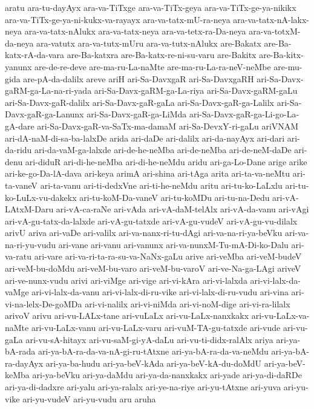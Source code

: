 {aratu
ara-tu-dayAyx
ara-va-TiTxge
ara-va-TiTx-geya
ara-va-TiTx-ge-ya-nikikx
ara-va-TiTx-ge-ya-ni-kukx-va-rayayx
ara-va-tatx-mU-ra-neya
ara-va-tatx-nA-lakx-neya
ara-va-tatx-nAlukx
ara-va-tatx-neya
ara-va-tetx-ra-Da-neya
ara-va-totxM-da-neya
ara-vatutx
ara-va-tutx-mUru
ara-va-tutx-nAlukx
are-Bakatx
are-Ba-katx-rA-da-vara
are-Ba-katxra
are-Ba-katx-re-ni-su-varu
are-Bakitx
are-Ba-kitx-yanunx
are-de-re-deve
are-ma-ru-La-naMte
are-ma-ru-La-ra-neV-neMbe
are-mu-gida
are-pA-da-dalilx
areve
ariH
ari-Sa-DavxgaR
ari-Sa-DavxgaRH
ari-Sa-Davx-gaRM-ga-La-na-ri-yada
ari-Sa-Davx-gaRM-ga-La-riya
ari-Sa-Davx-gaRM-gaLu
ari-Sa-Davx-gaR-dalilx
ari-Sa-Davx-gaR-gaLa
ari-Sa-Davx-gaR-ga-Lalilx
ari-Sa-Davx-gaR-ga-Lanunx
ari-Sa-Davx-gaR-ga-LiMda
ari-Sa-Davx-gaR-ga-Li-go-La-gA-dare
ari-Sa-Davx-gaR-va-SaTx-ma-damaM
ari-Sa-DevxY-ri-gaLu
ariVNAM
ari-dA-naM-di-sa-ba-lalxDe
arida
ari-daDe
ari-dalilx
ari-da-nayAyx
ari-dari
ari-da-ridu
ari-da-vaM-ga-lalxde
ari-de-he-neMba
ari-de-neMba
ari-de-neM-daDe
ari-denu
ari-diduR
ari-di-he-neMba
ari-di-he-neMdu
aridu
ari-ga-Lo-Dane
arige
arike
ari-ke-go-Da-lA-dava
ari-keya
arimA
ari-shina
ari-tAga
arita
ari-ta-va-neMtu
ari-ta-vaneV
ari-ta-vanu
ari-ti-dedxVne
ari-ti-he-neMdu
aritu
ari-tu-ko-LaLxlu
ari-tu-ko-LuLx-vu-dakekx
ari-tu-koM-Da-vaneV
ari-tu-koMDu
ari-tu-na-Dedu
ari-vA-LAtxM-Daru
ari-vA-ca-raNe
ari-vAda
ari-vA-daM-telAlx
ari-vA-da-vanu
ari-vAgi
ari-vA-gu-tatx-da-lalxde
ari-vA-gu-tatxde
ari-vA-gu-vudeV
ari-vA-gu-vu-dilalx
arivU
ariva
ari-vaDe
ari-valilx
ari-va-nanx-ri-tu-dAgi
ari-va-na-ri-ya-beVku
ari-va-na-ri-yu-vudu
ari-vane
ari-vanu
ari-vanunx
ari-va-nunxM-Tu-mA-Di-ko-Dalu
ari-va-ratu
ari-vare
ari-va-ri-ta-ra-su-va-NaNx-gaLu
arive
ari-veMba
ari-veM-budeV
ari-veM-bu-doMdu
ari-veM-bu-varo
ari-veM-bu-varoV
ari-ve-Na-ga-LAgi
ariveV
ari-ve-nunx-vudu
arivi
ari-viMge
ari-vige
ari-vi-kAra
ari-vi-lalxda
ari-vi-lalx-da-vaMge
ari-vi-lalx-da-vanu
ari-vi-lalx-di-ru-vike
ari-vi-lalx-di-ru-vudu
ari-vina
ari-vi-na-lelx-De-goMDa
ari-vi-nalilx
ari-vi-niMda
ari-vi-noM-dige
ari-vi-ra-lilalx
arivoV
arivu
ari-vu-LALx-tane
ari-vuLaLx
ari-vu-LaLx-nanxkakx
ari-vu-LaLx-va-naMte
ari-vu-LaLx-vanu
ari-vu-LaLx-varu
ari-vuM-TA-gu-tatxde
ari-vude
ari-vu-gaLa
ari-vu-sA-hitayx
ari-vu-saM-gi-yA-daLu
ari-vu-ti-didx-ralAlx
ariya
ari-ya-bA-rada
ari-ya-bA-ra-da-va-nA-gi-ru-tAtxne
ari-ya-bA-ra-da-va-neMdu
ari-ya-bA-ra-dayAyx
ari-ya-ba-hudu
ari-ya-beV-kAda
ari-ya-beV-kA-du-doMdU
ari-ya-beV-keMba
ari-ya-beVku
ari-ya-daMdu
ari-ya-da-nanxkakx
ari-yade
ari-ya-di-daRDe
ari-ya-di-dadxre
ari-yalu
ari-ya-ralalx
ari-ye-na-riye
ari-yu-tAtxne
ari-yuva
ari-yu-vike
ari-yu-vudeV
ari-yu-vudu
aru
aruha
}
